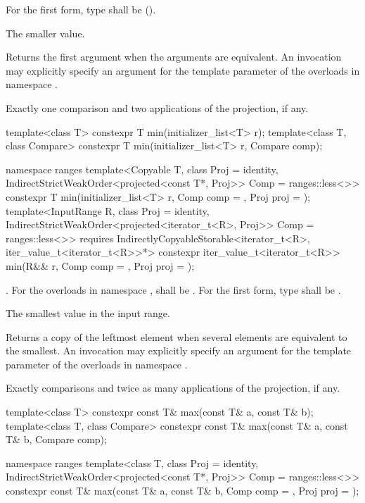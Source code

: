 \begin{itemdescr}
\pnum
\requires
For the first form, type  shall be
 ().

\pnum
\returns
The smaller value.

\pnum
\remarks
Returns the first argument when the arguments are equivalent.
An invocation may explicitly specify
an argument for the template parameter 
of the overloads in namespace .

\pnum
\complexity
Exactly one comparison and two applications of the projection, if any.
\end{itemdescr}

%
\begin{itemdecl}
template<class T>
  constexpr T min(initializer_list<T> r);
template<class T, class Compare>
  constexpr T min(initializer_list<T> r, Compare comp);

namespace ranges {
  template<Copyable T, class Proj = identity,
           IndirectStrictWeakOrder<projected<const T*, Proj>> Comp = ranges::less<>>
    constexpr T min(initializer_list<T> r, Comp comp = {}, Proj proj = {});
  template<InputRange R, class Proj = identity,
           IndirectStrictWeakOrder<projected<iterator_t<R>, Proj>> Comp = ranges::less<>>
    requires IndirectlyCopyableStorable<iterator_t<R>, iter_value_t<iterator_t<R>>*>
    constexpr iter_value_t<iterator_t<R>>
      min(R&& r, Comp comp = {}, Proj proj = {});
}
\end{itemdecl}

\begin{itemdescr}
\pnum
\requires
{}.
For the overloads in namespace ,
 shall be .
For the first form, type  shall be .

\pnum
\returns
The smallest value in the input range.

\pnum
\remarks
Returns a copy of the leftmost element
when several elements are equivalent to the smallest.
An invocation may explicitly specify
an argument for the template parameter 
of the overloads in namespace .

\pnum
\complexity
Exactly  comparisons
and twice as many applications of the projection, if any.
\end{itemdescr}

%
\begin{itemdecl}
template<class T>
  constexpr const T& max(const T& a, const T& b);
template<class T, class Compare>
  constexpr const T& max(const T& a, const T& b, Compare comp);

namespace ranges {
  template<class T, class Proj = identity,
           IndirectStrictWeakOrder<projected<const T*, Proj>> Comp = ranges::less<>>
    constexpr const T& max(const T& a, const T& b, Comp comp = {}, Proj proj = {});
}
\end{itemdecl}

